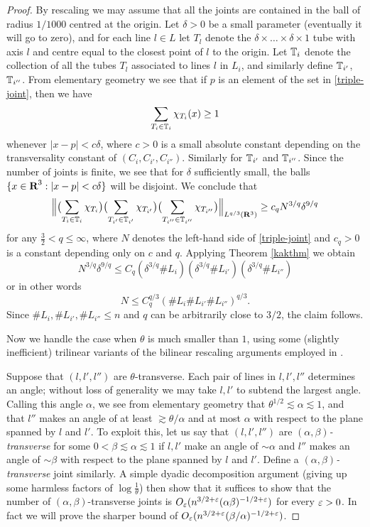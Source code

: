 \begin{proof}
By rescaling we may assume that all the joints are contained in
the ball of radius $1/1000$ centred at the origin. Let $\delta >
0$ be a small parameter (eventually it will go to zero), and for
each line $l \in L$ let $T_l$ denote the $\delta \times \ldots
\times \delta \times 1$ tube with axis $l$ and centre equal to the
closest point of $l$ to the origin.  Let ${\mathbb{T}}_i$ denote the
collection of all the tubes $T_l$ associated to lines $l$ in
$L_i$, and similarly define ${\mathbb{T}}_{i'}$, ${\mathbb{T}}_{i''}$.  From
elementary geometry we see that if $p$ is an element of the set in
\eqref{triple-joint}, then we have
$$ \sum_{T_i \in {\mathbb{T}}_i} \chi_{T_i}(x) \geq 1$$
whenever $|x-p| < c \delta$, where $c > 0$ is a small absolute
constant depending on the transversality constant of $(C_i,
C_{i'}, C_{i''})$.  Similarly for ${\mathbb{T}}_{i'}$ and
${\mathbb{T}}_{i''}$.  Since the number of joints is finite, we see that
for $\delta$ sufficiently small, the balls $\{ x \in {\hbox{\bf R}}^3: |x-p| <
c\delta \}$ will be disjoint.  We conclude that
$$ \Bigl\| \bigl(\sum_{T_i \in {\mathbb{T}}_i} \chi_{T_{i}}\bigr)
\bigl(\sum_{T_{i'} \in {\mathbb{T}}_{i'}} \chi_{T_{i'}}\bigr)
\bigl(\sum_{T_{i''} \in {\mathbb{T}}_{i''}} \chi_{T_{i''}}\bigr)
\Bigr\|_{L^{q/3}({\bf R}^3)} \geq c_q N^{3/q} \delta^{9/q}$$ for
any $\frac{3}{2} < q \leq \infty$, where $N$ denotes the left-hand
side of \eqref{triple-joint} and $c_q > 0$ is a constant depending
only on $c$ and $q$.  Applying Theorem \ref{kakthm} we obtain
$$ N^{3/q} \delta^{9/q} \leq C_q (\delta^{3/q} \# L_i) (\delta^{3/q} \# L_{i'}) (\delta^{3/q} \# L_{i''})$$
or in other words
\begin{equation}\label{n-bound}
 N \leq C_q^{q/3} (\# L_i \# L_{i'} \# L_{i''})^{q/3}.
\end{equation}
Since $\# L_i, \# L_{i'}, \# L_{i''} \leq n$ and $q$ can be
arbitrarily close to $3/2$, the claim follows.

Now we handle the case when $\theta$ is much smaller than $1$,
using some (slightly inefficient) trilinear variants of the
bilinear rescaling arguments employed in \cite{TVV}.

Suppose that $(l,l',l'')$ are $\theta$-transverse.  Each pair of
lines in $l,l',l''$ determines an angle; without loss of
generality we may take $l, l'$ to subtend the largest angle.
Calling this angle $\alpha$, we see from elementary geometry that
$\theta^{1/2} \lesssim \alpha \lesssim 1$, and that $l''$ makes an
angle of at least $\gtrsim \theta/\alpha$ and at most $\alpha$
with respect to the plane spanned by $l$ and $l'$.  To exploit
this, let us say that $(l,l',l'')$ are
\emph{$(\alpha,\beta)$-transverse} for some $0 < \beta \lesssim
\alpha \lesssim 1$ if $l,l'$ make an angle of $\sim \alpha$ and
$l''$ makes an angle of $\sim \beta$ with respect to the plane
spanned by $l$ and $l'$.  Define a
\emph{$(\alpha,\beta)$-transverse} joint similarly. A simple
dyadic decomposition argument (giving up some harmless factors of
$\log \frac{1}{\theta}$) then show that it suffices to show that
the number of $(\alpha,\beta)$-transverse joints is $O_\varepsilon(
n^{3/2+\varepsilon} (\alpha \beta)^{-1/2+\varepsilon} )$ for every $\varepsilon > 0$.
In fact we will prove the sharper bound of $O_\varepsilon( n^{3/2+\varepsilon}
(\beta/\alpha)^{-1/2+\varepsilon} )$.


\end{proof}
